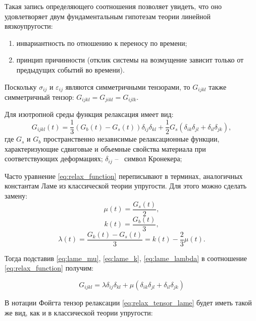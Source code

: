 \documentclass[a4paper, fontsize=14pt]{article}
\begin{document}
Такая запись определяющего соотношения позволяет увидеть, что оно удовлетворяет двум фундаментальным гипотезам теории линейной вязкоупругости:
\begin{enumerate}
    \item инвариантность по отношению к переносу по времени;
    \item принцип причинности (отклик системы на возмущение зависит только от предыдущих событий во времени).
\end{enumerate}

Поскольку $\sigma_{ij}$ и $\varepsilon_{ij}$ являются симметричными тензорами, то $G_{ijkl}$ также симметричный тензор: $G_{ijkl} = G_{jikl} = G_{ijlk}$.


Для изотропной среды функция релаксация имеет вид:
\begin{equation}
    \label{eq:relax_function}
    G_{ijkl} (t) = \frac{1}{3} \left( G_{b}(t) - G_{s}(t) \right) \delta_{ij} \delta_{kl} + \frac{1}{2} G_s \left( \delta_{ik} \delta_{jl} + \delta_{il} \delta_{jk}\right), 
\end{equation}
где $G_s$ и $G_b$ пространственно независимые релаксационные функции, характеризующие сдвиговые и объемные свойства материала при соответствующих деформациях; 
$\delta_{ij}$ --~  символ Кронекера;

Часто уравнение \eqref{eq:relax_function} переписывают в терминах, аналогичных константам Ламе из классической теории упругости. Для этого можно сделать замену:
\begin{equation}
    \label{eq:lame_mu}
    \mu(t) = \frac{G_s(t)}{2},
\end{equation}
\begin{equation}
    \label{eq:lame_k}
    k(t) = \frac{G_b(t)}{3},
\end{equation}
\begin{equation}
    \label{eq:lame_lambda}
    \lambda(t) = \frac{G_k(t) - G_s(t)}{3}  = k(t) - \frac{2}{3} \mu(t).
\end{equation}

Тогда подставив \eqref{eq:lame_mu}, \eqref{eq:lame_k}, \eqref{eq:lame_lambda} в соотношение \eqref{eq:relax_function} получим:

\begin{equation}
    \label{eq:relax_tensor_lame}
    G_{ijkl} = \lambda \delta_{ij} \delta_{kl} + \mu \left( \delta_{ik} \delta_{jl} + \delta_{il} \delta_{jk}\right)
\end{equation}

В нотации Фойгта тензор релаксации \eqref{eq:relax_tensor_lame} будет иметь такой же вид, как и в классической теории упругости:
\end{document}
